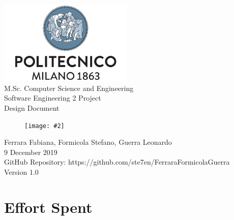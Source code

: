 \documentclass{report}
\newcommand{\image}[4]{
	\begin{figure}[H]
	\centering
	\texttt{[image: \#2]}
	\caption*{#3}
	\label{#4}

	\label{fig:nonfloat} %
	\end{figure}
}
\begin{document}
	\begin{titlepage}
		\centering	
		\vfill
		{
			\includegraphics[width =\linewidth, height = 4cm, keepaspectratio]{./Images/PolitecnicoLogo.png}
			\label{fig:PolitecnicoLogo}
			\large \\[2ex]M.Sc. Computer Science and Engineering\\
			\large Software Engineering 2 Project\\[9ex]			
			\huge Design Document\\[4ex]
			\image{3cm}{Images/Logo.png}{}{Logo}

			\normalsize Ferrara Fabiana, Formicola Stefano, Guerra Leonardo\\[1.5ex]
			\normalsize 9 December 2019 \\[1.5ex]
			\normalsize GitHub Repository: https://github.com/ste7en/FerraraFormicolaGuerra\\[3ex]
			\normalsize Version 1.0


		}
		
	\end{titlepage}


	
	\newpage
	\tableofcontents
	\thispagestyle{fancy}
	

	
	
	
	
	
	
		
	\chapter{Effort Spent}
	\thispagestyle{fancy}
\end{document}
